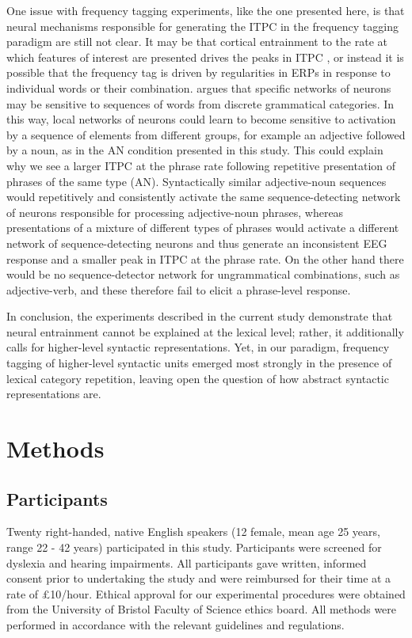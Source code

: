 \documentclass[10pt,letterpaper]{article}
\newcommand{\citet}[1]{\cite{#1}}
\begin{document}
One issue with frequency tagging experiments, like the one presented
here, is that neural mechanisms responsible for generating the ITPC in
the frequency tagging paradigm are still not clear. It may be that
cortical entrainment to the rate at which features of interest are
presented drives the peaks in ITPC \cite{Meyer2018}, or instead it is
possible that the frequency tag is driven by regularities in ERPs in
response to individual words or their
combination. \citet{PulvermullerEtAl2002} argues that specific
networks of neurons may be sensitive to sequences of words from
discrete grammatical categories. In this way, local networks of
neurons could learn to become sensitive to activation by a sequence of
elements from different groups, for example an adjective followed by a
noun, as in the AN condition presented in this study. This could
explain why we see a larger ITPC at the phrase rate following
repetitive presentation of phrases of the same type
(AN). Syntactically similar adjective-noun sequences would repetitively
and consistently activate the same sequence-detecting network of
neurons responsible for processing adjective-noun phrases, whereas
presentations of a mixture of different types of phrases would
activate a different network of sequence-detecting neurons and thus
generate an inconsistent EEG response and a smaller peak in ITPC at
the phrase rate. On the other hand there would be no sequence-detector
network for ungrammatical combinations, such as adjective-verb, and
these therefore fail to elicit a phrase-level response.

In conclusion, the experiments described in the current study
demonstrate that neural entrainment cannot be explained at the lexical
level; rather, it additionally calls for higher-level syntactic
representations. Yet, in our paradigm, frequency tagging of
higher-level syntactic units emerged most strongly in the presence of
lexical category repetition, leaving open the question of how abstract
syntactic representations are.


\section*{Methods}
\subsection*{Participants}

Twenty right-handed, native English speakers (12 female, mean age 25
years, range 22 - 42 years) participated in this study. Participants
were screened for dyslexia and hearing impairments. All participants
gave written, informed consent prior to undertaking the study and were
reimbursed for their time at a rate of £10/hour. Ethical approval for
our experimental procedures were obtained from the University of
Bristol Faculty of Science ethics board. All methods were performed in
accordance with the relevant guidelines and regulations.
\end{document}
